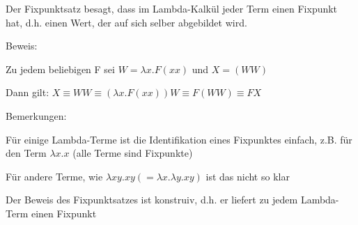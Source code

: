 \documentclass[10pt]{article}
\begin{document}
  \begin{itemize*}
    \item Der Fixpunktsatz besagt, dass im Lambda-Kalkül jeder Term einen Fixpunkt hat, d.h. einen Wert, der auf sich selber abgebildet wird.
    \item Beweis:
    \begin{itemize*}
      \item Zu jedem beliebigen F sei $W =\lambda x.F(x x)$ und $X = (W W)$
      \item Dann gilt: $X\equiv WW \equiv(\lambda x.F(x x)) W \equiv F(W W) \equiv F X$
    \end{itemize*}
    \item Bemerkungen:
    \begin{itemize*}
      \item Für einige Lambda-Terme ist die Identifikation eines Fixpunktes einfach, z.B. für den Term $\lambda x.x$ (alle Terme sind Fixpunkte)
      \item Für andere Terme, wie $\lambda xy.xy (= \lambda x.\lambda y.xy)$ ist das nicht so klar
      \item Der Beweis des Fixpunktsatzes ist konstruiv, d.h. er liefert zu jedem Lambda-Term einen Fixpunkt
    \end{itemize*}
  \end{itemize*}
  
\end{document}
